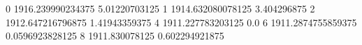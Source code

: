 0 1916.239990234375 5.01220703125
1 1914.632080078125 3.404296875
2 1912.647216796875 1.41943359375
4 1911.227783203125 0.0
6 1911.2874755859375 0.0596923828125
8 1911.830078125 0.602294921875
